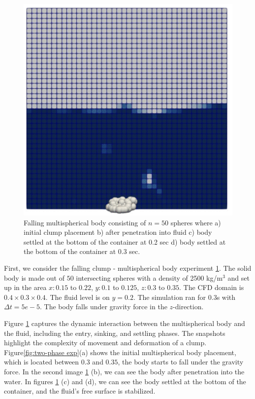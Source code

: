 \begin{figure}[H]
\begin{minipage}{.5\textwidth}
    \end{minipage}%
    \begin{minipage}{.5\textwidth}
        \centering
        \includegraphics[width=\linewidth]{Images/chap4/clump_4.png}
    \end{minipage}
    \caption{Falling multispherical body consisting of $n = 50$ spheres where a) initial clump placement b) after penetration into fluid c) body settled at the bottom of the container at 0.2 sec d) body settled at the bottom of the container at 0.3 sec.}
    \label{fig:two-phase_exp}
\end{figure}

First, we consider the falling clump - multispherical body experiment \ref{fig:two-phase_exp}. The solid body is made out of $50$ intersecting spheres with a density of 2500 kg/m$^3$ and set up in the area $x: 0.15 $ to $0.22$, $y: 0.1$ to $0.125$, $z: 0.3$ to $0.35$. The CFD domain is $0.4\times 0.3\times0.4$. The fluid level is on $y = 0.2$. The simulation ran for $0.3$s with $\Delta t = 5e-5$. The body falls under gravity force in the $z$-direction. 

Figure \ref{fig:two-phase_exp} captures the dynamic interaction between the multispherical body and the fluid, including the entry, sinking, and settling phases. The snapshots highlight the complexity of movement and deformation of a clump. Figure\ref{fig:two-phase exp}(a) shows the initial multispherical body placement, which is located between $0.3$ and $0.35$, the body starts to fall under the gravity force. In the second image \ref{fig:two-phase_exp} (b), we can see the body after penetration into the water. In figures \ref{fig:two-phase_exp} (c) and (d), we can see the body settled at the bottom of the container, and the fluid's free surface is stabilized.


